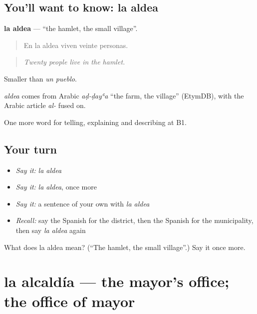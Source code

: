 \subsection*{You'll want to know: la aldea}
\textbf{la aldea} — \textquotedblleft{}the hamlet, the small village\textquotedblright{}.

\begin{quote}
En la aldea viven veinte personas.
\end{quote}

\begin{quote}
\emph{Twenty people live in the hamlet.}
\end{quote}

Smaller than \emph{un pueblo}.

\begin{cousinweb}
\emph{aldea} comes from Arabic \emph{aḍ-ḍayʿa} \textquotedblleft{}the farm, the village\textquotedblright{} (EtymDB), with the Arabic article \emph{al-} fused on.
\end{cousinweb}

\begin{grammarlens}[title={What you've built}]
One more word for telling, explaining and describing at B1.
\end{grammarlens}

\subsection*{Your turn}
\begin{itemize}
\raggedright
  \item \emph{Say it:} \emph{la aldea}
  \item \emph{Say it:} \emph{la aldea}, once more
  \item \emph{Say it:} a sentence of your own with \emph{la aldea}
  \item \emph{Recall:} say the Spanish for the district, then the Spanish for the municipality, then say \emph{la aldea} again
\end{itemize}

\begin{tcolorbox}[breakable,colback=teal!4,colframe=teal!35!black,title={Before you move on}]
What does la aldea mean? (\textquotedblleft{}The hamlet, the small village\textquotedblright{}.) Say it once more.
\end{tcolorbox}
\section[la alcaldía]{la alcaldía — the mayor’s office; the office of mayor}

